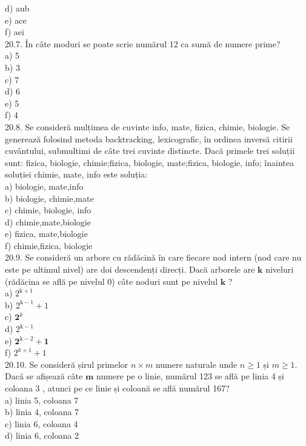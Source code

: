 {{d) aub
\\
e) ace
\\
f) aei
\\
20.7. În câte moduri se poate scrie numărul 12 ca sumă de numere prime?
\\
a) 5
\\
b) 3
\\
c) 7
\\
d) 6
\\
e) 5
\\
f) 4
\\
20.8. Se consideră mulțimea de cuvinte {info, mate, fizica, chimie, biologie}. Se generează folosind metoda backtracking, lexicografic, în ordinea inversă citirii cuvântului, submultimi de câte trei cuvinte distincte. Dacă primele trei soluții sunt: {fizica, biologie, chimie};{fizica, biologie, mate};{fizica, biologie, info}; înaintea soluției {chimie, mate, info} este soluția:
\\
a) {biologie, mate,info}
\\
b) {biologie, chimie,mate}
\\
c) {chimie, biologie,  info}
\\
d) {chimie,mate,biologie}
\\
e) {fizica, mate,biologie}
\\
f) {chimie,fizica, biologie}
\\
20.9. Se consideră un arbore cu rădăcină în care fiecare nod intern (nod care nu este pe ultimul nivel) are doi descendenți direcți. Dacă arborele are $\mathbf{k}$ niveluri (rădăcina se află pe nivelul 0) câte noduri sunt pe nivelul $\mathbf{k}$ ?
\\
a) $2^{\mathrm{k}+1}$
\\
b) $2^{\mathrm{k}-1}+1$
\\
c) $\mathbf{2}^{k}$
\\
d) $2^{\mathrm{k}-1}$
\\
e) $\mathbf{2}^{\mathrm{k}-2}+\mathbf{1}$
\\
f) $2^{k+1}+1$
\\
20.10. Se consideră șirul primelor $n \times m$ numere naturale unde $n \geq 1$ și $m \geq 1$. Dacă se afișează câte $\mathbf{m}$ numere pe o linie, numărul 123 se află pe linia 4 și coloana 3 , atunci pe ce linie și coloană se află numărul 167?
\\
a) linia 5, coloana 7
\\
b) linia 4, coloana 7
\\
c) linia 6, coloana 4
\\
d) linia 6, coloana 2
\\
}}
